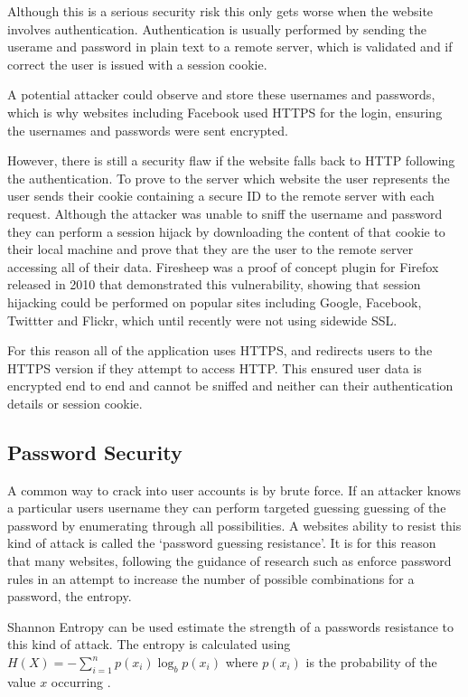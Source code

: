 Although this is a serious security risk this only gets worse when the website involves authentication. Authentication is usually performed by sending the userame and password in plain text to a remote server, which is validated and if correct the user is issued with a session cookie.

A potential attacker could observe and store these usernames and passwords, which is why websites including Facebook used HTTPS for the login, ensuring the usernames and passwords were sent encrypted. 

However, there is still a security flaw if the website falls back to HTTP following the authentication. To prove to the server which website the user represents the user sends their cookie containing a secure ID to the remote server with each request. Although the attacker was unable to sniff the username and password they can perform a session hijack by downloading the content of that cookie to their local machine and prove that they are the user to the remote server accessing all of their data. 
% 
Firesheep was a proof of concept plugin for Firefox released in 2010 that demonstrated this vulnerability, showing that session hijacking could be performed on popular sites including Google, Facebook, Twittter and Flickr, which until recently were not using sidewide SSL.

For this reason all of the application uses HTTPS, and redirects users to the HTTPS version if they attempt to access HTTP. This ensured user data is encrypted end to end and cannot be sniffed and neither can their authentication details or session cookie.

\subsection{Password Security}

A common way to crack into user accounts is by brute force. If an attacker knows a particular users username they can perform targeted guessing guessing of the password by enumerating through all possibilities. A websites ability to resist this kind of attack is called the `password guessing resistance'. It is for this reason that many websites, following the guidance of research such as \cite{needed} enforce password rules in an attempt to increase the number of possible combinations for a password, the entropy.

Shannon Entropy can be used estimate the strength of a passwords resistance to this kind of attack. The entropy is calculated using $H(X)= -\sum_{i=1}^n{p(x_i)\log_b p(x_i)}$ where $p(x_i)$ is the probability of the value $x$ occurring \cite{burr2013electronic}.

